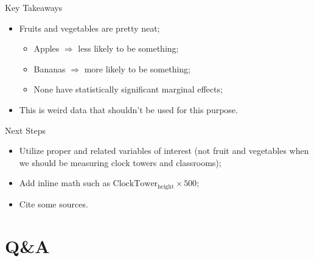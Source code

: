 \documentclass[usenames,dvipsnames]{beamer}
\begin{document}
\begin{frame}{Key Takeaways}
    \begin{itemize}
        \item Fruits and vegetables are pretty neat;\\
        \begin{itemize}
            \item Apples $\Rightarrow$ less likely to be something;
            \item Bananas $\Rightarrow$ more likely to be something;
            \item None have statistically significant marginal effects;
        \end{itemize}
        \item This is weird data that shouldn't be used for this purpose.\\
    \end{itemize}
\end{frame}

\begin{frame}{Next Steps}
    \begin{itemize}
        \item Utilize proper and related variables of interest (not fruit and vegetables when we should be measuring clock towers and classrooms);
        \item Add inline math such as $\text{ClockTower}_{\text{height}}\times 500$;
        \item Cite some sources.
    \end{itemize}
    \hyperlink{references}{}
\end{frame}

\section{Q\&A}
\end{document}
